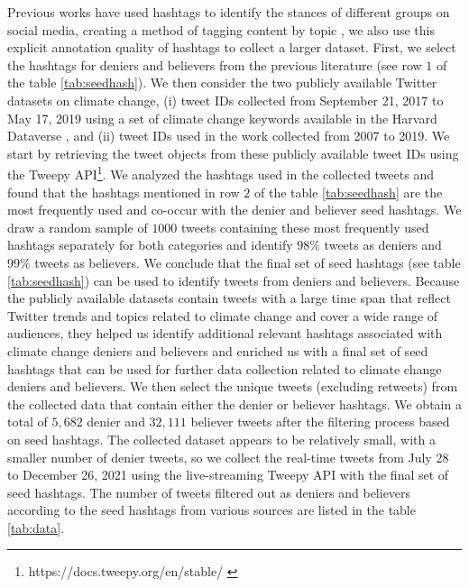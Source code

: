 \documentclass[letterpaper]{article} %
\begin{document}
Previous works have used hashtags to identify the stances of different groups on social media, creating a method of tagging content by topic \cite{misra-etal-2016-nlds}, we also use this explicit annotation quality of hashtags to collect a larger dataset. First, we select the hashtags for deniers and believers \cite{tyagi2020polarizing} from the previous literature (see row $1$ of the table \ref{tab:seedhash}). We then consider the two publicly available Twitter datasets on climate change, (i) tweet IDs collected from September 21, 2017 to May 17, 2019 using a set of climate change keywords available in the Harvard Dataverse \cite{DVN/5QCCUU_2019}, and (ii) tweet IDs used in the work \cite{samantray2019credibility} collected from 2007 to 2019. We start by retrieving the tweet objects from these publicly available tweet IDs using the Tweepy API\footnote{https://docs.tweepy.org/en/stable/ \label{tweepy}}. We analyzed the hashtags used in the collected tweets and found that the hashtags mentioned in row $2$ of the table \ref{tab:seedhash} are the most frequently used and co-occur with the denier and believer seed hashtags. We draw a random sample of $1000$ tweets containing these most frequently used hashtags separately for both categories and identify $98\%$ tweets as deniers and $99\%$ tweets as believers. We conclude that the final set of seed hashtags (see table \ref{tab:seedhash}) can be used to identify tweets from deniers and believers. %
Because the publicly available datasets contain tweets with a large time span that reflect Twitter trends and topics related to climate change and cover a wide range of audiences, they helped us identify additional relevant hashtags associated with climate change deniers and believers and enriched us with a final set of seed hashtags that can be used for further data collection related to climate change deniers and believers. We then select the unique tweets (excluding retweets) from the collected data that contain either the denier or believer hashtags. We obtain a total of $5,682$ denier and $32,111$ believer tweets after the filtering process based on seed hashtags. %
The collected dataset appears to be relatively small, with a smaller number of denier tweets, so we collect the real-time tweets from July 28 to December 26, 2021 using the live-streaming Tweepy API with the final set of seed hashtags. The number of tweets filtered out as deniers and believers according to the seed hashtags from various sources are listed in the table \ref{tab:data}.
\end{document}
